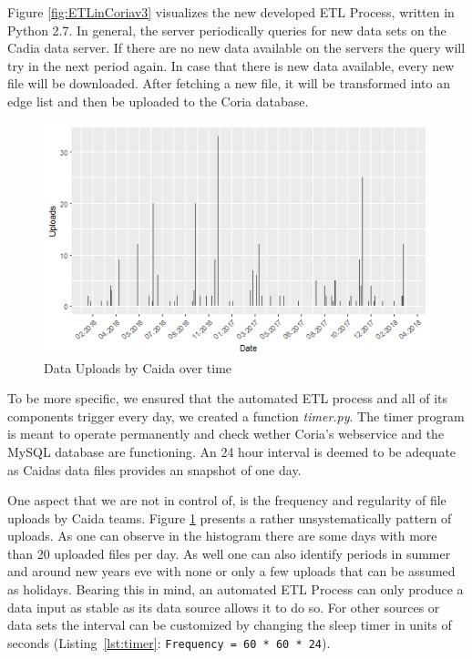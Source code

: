 \documentclass[conference, 11pt]{IEEEtran}
\begin{document}
Figure \ref{fig:ETLinCoriav3} visualizes the new developed ETL Process, written in Python 2.7. In general, the server periodically queries for new data sets on the Cadia data server. If there are no new data available on the servers the query will try in the next period again. 
In case that there is new data available, every new file will be downloaded. After fetching a new file, it will be transformed into an edge list and then be uploaded to the Coria database.
\linebreak

\vspace{0.2cm}
\begin{figure}[htbp]
\centerline{\includegraphics[scale=0.5]{Graphics/uploadFrequency.png}}
\caption{Data Uploads by Caida over time}
\label{fig:UploadOverTime}
\end{figure}
\vspace{0.5cm}


To be more specific, we ensured that the automated ETL process and all of its components trigger every day, we created a function \textit{timer.py}. The timer program is meant to operate permanently and check wether Coria's webservice and the MySQL database are functioning. An 24 hour interval is deemed to be adequate as Caida\textquotesingle s data files provides an snapshot of one day. %

One aspect that we are not in control of, is the frequency and regularity of file uploads by Caida teams. Figure \ref{fig:UploadOverTime} presents a rather unsystematically pattern of uploads. As one can observe in the histogram there are some days with more than 20 uploaded files per day. As well one can also identify periods in summer and around new years eve with none or only a few uploads that can be assumed as holidays. Bearing this in mind, an automated ETL Process can only produce a data input as stable as its data source allows it to do so.
For other sources or data sets the interval can be customized by changing the sleep timer in units of seconds (Listing~\ref{lst:timer}: \lstinline{Frequency = 60 * 60 * 24}).\linebreak
\end{document}
